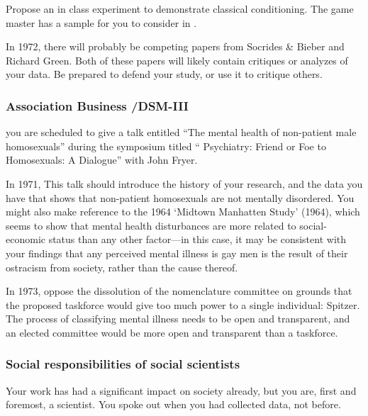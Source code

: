 \begin{refsection}
\begin{researchtask}[Hooker]\label{researchtask:hooker}Propose an in class experiment to demonstrate classical conditioning. The game master has a sample for you to consider in .\end{researchtask}

In 1972, there will probably be competing papers from Socrides \& Bieber and Richard Green. Both of these papers will likely contain critiques or analyzes of your data. Be prepared to defend your study, or use it to critique others.

\subsubsection{Association Business \slash  DSM-III}
\label{associationbusinessdsm-iii}

\begin{writingtask}[Hooker]\label{writingtask:hooker}
you are scheduled to give a talk entitled “The mental health of non-patient male homosexuals” during the symposium titled “ Psychiatry: Friend or Foe to Homosexuals: A Dialogue” with John Fryer.
\end{writingtask}

In 1971, This talk should introduce the history of your research, and the data you have that shows that non-patient homosexuals are not mentally disordered. You might also make reference to the 1964 ‘Midtown Manhatten Study’ (1964), which seems to show that mental health disturbances are more related to social-economic status than any other factor—in this case, it may be consistent with your findings that any perceived mental illness is gay men is the result of their ostracism from society, rather than the cause thereof. 

In 1973, oppose the dissolution of the nomenclature committee on grounds that the proposed taskforce would give too much power to a single individual: Spitzer. The process of classifying mental illness needs to be open and transparent, and an elected committee would be more open and transparent than a taskforce.

\subsubsection{Social responsibilities of social scientists}
\label{socialresponsibilitiesofsocialscientists}

Your work has had a significant impact on society already, but you are, first and foremost, a scientist. You spoke out when you had collected data, not before.


\end{refsection}
